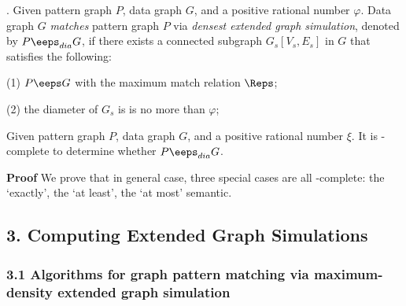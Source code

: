 . Given pattern graph $P$, data graph $G$, and a positive rational number $\varphi$. Data graph $G$ {\em matches} pattern graph $P$  via {\em densest extended graph simulation}, denoted by $P \eeps_{dia} G$, if there exists a connected subgraph $G_s[V_s, E_s]$ in $G$ that satisfies the following:

\vspace{0.5ex}
\ni(1) $P \eeps G$ with the maximum match relation $\Reps$;

\vspace{0.5ex}
\ni(2) the diameter of $G_s$ is is no more than $\varphi$;

\begin{theorem}
\label{thm-esim-dia-opt-complexity}
Given pattern graph $P$, data graph $G$, and a positive rational number $\xi$. It is \NP-complete to determine whether $P \eeps_{dia} G$.
\end{theorem}

\textbf{Proof} We prove that in general case, three special cases are all \NP-complete: the `exactly', the `at least', the `at most' semantic.

\subsection*{3. Computing Extended Graph Simulations}

\subsubsection*{3.1 Algorithms for graph pattern matching via maximum-density extended graph simulation}

